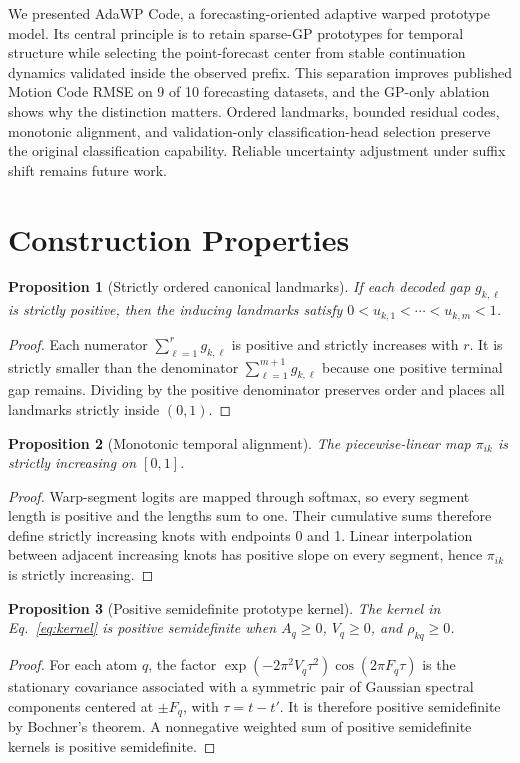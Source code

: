 \documentclass[11pt]{article}
\newcommand{\method}{AdaWP Code}
\newcommand{\mc}{Motion Code}
\newtheorem{proposition}{Proposition}
\begin{document}
We presented \method{}, a forecasting-oriented adaptive warped prototype model. Its central principle is to retain sparse-GP prototypes for temporal structure while selecting the point-forecast center from stable continuation dynamics validated inside the observed prefix. This separation improves published \mc{} RMSE on 9 of 10 forecasting datasets, and the GP-only ablation shows why the distinction matters. Ordered landmarks, bounded residual codes, monotonic alignment, and validation-only classification-head selection preserve the original classification capability. Reliable uncertainty adjustment under suffix shift remains future work.

\clearpage



\appendix

\section{Construction Properties}
\label{app:proofs}

\begin{proposition}[Strictly ordered canonical landmarks]
If each decoded gap $g_{k,\ell}$ is strictly positive, then the inducing landmarks satisfy
$0<u_{k,1}<\cdots<u_{k,m}<1$.
\end{proposition}
\begin{proof}
Each numerator $\sum_{\ell=1}^{r}g_{k,\ell}$ is positive and strictly increases with $r$. It is strictly smaller than the denominator $\sum_{\ell=1}^{m+1}g_{k,\ell}$ because one positive terminal gap remains. Dividing by the positive denominator preserves order and places all landmarks strictly inside $(0,1)$.
\end{proof}

\begin{proposition}[Monotonic temporal alignment]
The piecewise-linear map $\pi_{ik}$ is strictly increasing on $[0,1]$.
\end{proposition}
\begin{proof}
Warp-segment logits are mapped through softmax, so every segment length is positive and the lengths sum to one. Their cumulative sums therefore define strictly increasing knots with endpoints 0 and 1. Linear interpolation between adjacent increasing knots has positive slope on every segment, hence $\pi_{ik}$ is strictly increasing.
\end{proof}

\begin{proposition}[Positive semidefinite prototype kernel]
The kernel in Eq.~\eqref{eq:kernel} is positive semidefinite when $A_q\geq0$, $V_q\geq0$, and $\rho_{kq}\geq0$.
\end{proposition}
\begin{proof}
For each atom $q$, the factor
$\exp(-2\pi^2 V_q\tau^2)\cos(2\pi F_q\tau)$
is the stationary covariance associated with a symmetric pair of Gaussian spectral components centered at $\pm F_q$, with $\tau=t-t'$. It is therefore positive semidefinite by Bochner's theorem. A nonnegative weighted sum of positive semidefinite kernels is positive semidefinite.
\end{proof}
\end{document}
